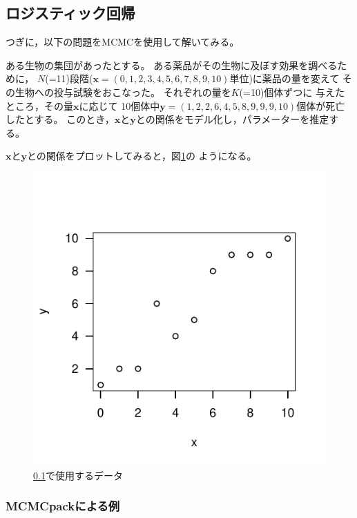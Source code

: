 \documentclass[11pt,uplatex]{jsarticle}
\begin{document}
\vspace{1zw}




\subsection{ロジスティック回帰}
\label{logistic}


つぎに，以下の問題をMCMCを使用して解いてみる。
\vspace{1zw}

\hspace{18mm}
\begin{minipage}{100mm}
\begin{breakbox}
\noindent
ある生物の集団があったとする。
ある薬品がその生物に及ぼす効果を調べるために，
$N$(=11)段階($\bm{x} = (0, 1, 2, 3, 4, 5, 6, 7, 8, 9, 10)$単位)に薬品の量を変えて
その生物への投与試験をおこなった。
それぞれの量を$K$(=10)個体ずつに
与えたところ，その量$\bm{x}$に応じて
10個体中$\bm{y} = (1, 2, 2, 6, 4, 5, 8, 9, 9, 9, 10)$個体が死亡したとする。
このとき，$\bm{x}$と$\bm{y}$との関係をモデル化し，パラメーターを推定する。
\end{breakbox}
\end{minipage}
\vspace{1zw}

$\bm{x}$と$\bm{y}$との関係をプロットしてみると，図\ref{example2_plot}の
ようになる。

\begin{figure}[htbp]
  \begin{center}
    \includegraphics[bb=0 0 240 240, clip, width=160 bp]{example2.pdf}
  \end{center}
  \caption{\ref{logistic}で使用するデータ}
  \label{example2_plot}
\end{figure}


\subsubsection{MCMCpackによる例}
\end{document}
